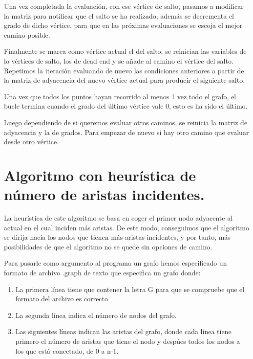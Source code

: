 Una vez completada la evaluación, con ese vértice de salto, pasamos a modificar la matriz para notificar que el salto se ha realizado, además se decrementa el grado de dicho vértice, para que en las próximas evaluaciones se escoja el mejor camino posible.
\vspace{5mm}

Finalmente se marca como vértice actual el del salto, se reinician las variables de lo vértices de salto, los de dead end y se añade al camino el vértice del salto. Repetimos la iteración evaluando de nuevo las condiciones anteriores a partir de la matriz de adyacencia del nuevo vértice actual para producir el siguiente salto.
\vspace{5mm}

Una vez que todos los puntos hayan recorrido al menos 1 vez todo el grafo, el bucle termina cuando el grado del último vértice vale 0, esto es ha sido el último.
\vspace{5mm}

Luego dependiendo de si queremos evaluar otros caminos, se reinicia la matriz de adyacencia y la de grados. Para empezar de nuevo si hay otro camino que evaluar desde otro vértice.

\newpage
\section{Algoritmo con heurística de número de aristas incidentes.}

La heurística de este algoritmo se basa en coger el primer nodo adyacente al actual en el cual inciden más aristas. De este modo, conseguimos que el algoritmo se dirija hacia los nodos que tienen más aristas incidentes, y por tanto, más posibilidades de que el algoritmo no se quede sin opciones de camino.
\vspace{5mm}

Para pasarle como argumento al programa un grafo hemos especificado un formato de archivo .graph de texto que especifica un grafo donde:

\begin{enumerate}
    \item La primera línea tiene que contener la letra G para que se compruebe que el formato del archivo es correcto
    \item La segunda línea indica el número de nodos del grafo.
    \item Las siguientes líneas indican las aristas del grafo, donde cada línea tiene primero el número de aristas que tiene el nodo y despúes todos los nodos a los que está conectado, de 0 a n-1.
\end{enumerate}

